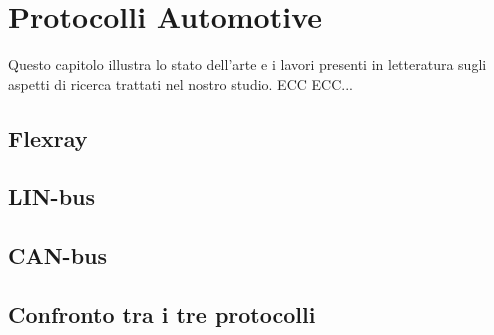 \chapter{Protocolli Automotive} %
%

\begin{citazione}
Questo capitolo illustra lo stato dell'arte e i lavori presenti in letteratura sugli aspetti di ricerca trattati nel nostro studio. ECC ECC...
\end{citazione}

\section{Flexray}

\section{LIN-bus}

\section{CAN-bus}

\section{Confronto tra i tre protocolli}

\newpage
